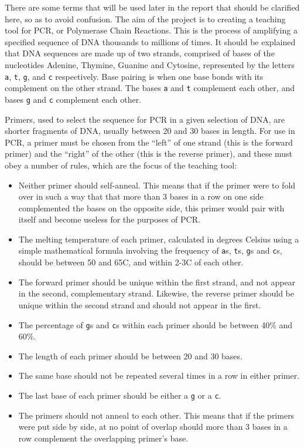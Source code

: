 
There are some terms that will be used later in the report that should
be clarified here, so as to avoid confusion.
The aim of the project is to creating a teaching tool for PCR, or
Polymerase Chain Reactions.
This is the process of amplifying a specified sequence of DNA thousands to
millions of times.
It should be explained that DNA sequences are made up of two strands,
comprised of bases of the nucleotides Adenine, Thymine, Guanine and
Cytosine, represented by the letters \verb£a£, \verb£t£, \verb£g£, and
\verb£c£ respectively.
Base pairing is when one base bonds with its complement on the other
strand.
The bases \verb£a£ and \verb£t£ complement each other, and bases
\verb£g£ and \verb£c£ complement each other.

Primers, used to select the sequence for PCR in a given selection of
DNA, are shorter fragments of DNA, usually between 20 and 30 bases in
length.
For use in PCR, a primer must be chosen from the ``left'' of one
strand (this is the forward primer) and the ``right'' of the other
(this is the reverse primer), and these must obey a number of rules,
which are the focus of the teaching tool:
\begin{itemize}
\item Neither primer should self-anneal. 
  This means that if the primer were to fold over
  in such a way that that more than 3 bases in a row on one side
  complemented the bases on the opposite side, this primer would pair 
  with itself and become useless for the purposes of PCR.
\item The melting temperature of each primer, calculated in degrees
  Celsius using a simple mathematical formula involving the frequency
  of \verb£a£s, \verb£t£s, \verb£g£s and \verb£c£s, should be between
  50 and 65\degree C, and within 2-3\degree C of each other.
\item The forward primer should be unique within the first strand, and
  not appear in the second, complementary strand. Likewise, the
  reverse primer should be unique within the second strand and should
  not appear in the first.
\item The percentage of \verb£g£s and \verb£c£s within each primer
  should be between 40\% and 60\%.
\item The length of each primer should be between 20 and 30 bases.
\item The same base should not be repeated several times in a row in
  either primer.
\item The last base of each primer should be either a \verb£g£ or a
  \verb£c£.
\item The primers should not anneal to each other. 
  This means that if the primers were put side by side, at no point of
  overlap should more than 3 bases in a row complement the overlapping
  primer’s base.
\end{itemize}

